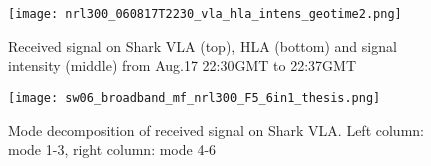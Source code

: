 \begin{figure}[H]
  \centering
  \texttt{[image: nrl300\_060817T2230\_vla\_hla\_intens\_geotime2.png]}
  \caption{Received signal on Shark VLA (top), HLA (bottom) and signal intensity (middle) from Aug.17 22:30GMT to 22:37GMT }\label{fig:a2230}
\end{figure}

\begin{figure}[h]
\centering
 \texttt{[image: sw06\_broadband\_mf\_nrl300\_F5\_6in1\_thesis.png]}
  \caption{Mode decomposition of received signal on Shark VLA. 
    Left column: mode 1-3, right column: mode 4-6 }\label{fig:m2230}
\end{figure}


